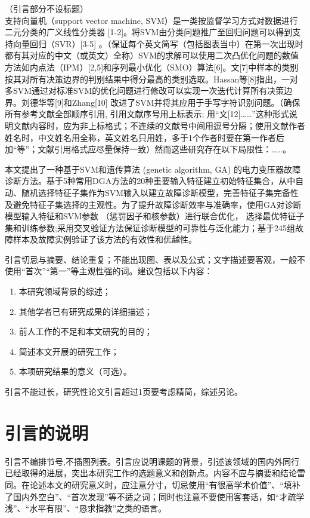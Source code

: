 \documentclass[10.5pt,twocolumn]{jthu-st}
\begin{document}
\enlargethispage{-3.3cm}

（引言部分不设标题）\\
支持向量机（support vector machine, SVM）是一类按监督学习方式对数据进行二元分类的广义线性分类器 [1-2]。将SVM由分类问题推广至回归问题可以得到支持向量回归（SVR）[3-5] 。（保证每个英文简写（包括图表当中）在第一次出现时都有其对应的中文（或英文）全称）SVM的求解可以使用二次凸优化问题的数值方法如内点法（IPM）[2,5]和序列最小优化（SMO）算法[6]。文[7]中样本的类别按其对所有决策边界的判别结果中得分最高的类别选取。Hassan等[8]指出，一对多SVM通过对标准SVM的优化问题进行修改可以实现一次迭代计算所有决策边界。刘德华等[9]和Zhang[10] 改进了SVM并将其应用于手写字符识别问题。（确保所有参考文献全部顺序引用, 引用文献序号用上标表示; 用“文[12]……”这种形式说明文献内容时，应为非上标格式；不连续的文献号中间用逗号分隔；使用文献作者姓名时，中文姓名用全称，英文姓名只用姓，多于1个作者时要在第一作者后加“等”；文献引用格式应尽量保持一致）然而这些研究存在以下局限性：……。
\enlargethispage{-3.3cm}

本文提出了一种基于SVM和遗传算法 (genetic algorithm, GA) 的电力变压器故障诊断方法。基于5种常用DGA方法的20种重要输入特征建立初始特征集合，从中自动、随机选择特征子集作为SVM输入以建立故障诊断模型，完善特征子集完备性及避免特征子集选择的主观性。为了提升故障诊断效率与准确率，使用GA对诊断模型输入特征和SVM参数 （惩罚因子和核参数）进行联合优化， 选择最优特征子集和训练参数;采用交叉验证方法保证诊断模型的可靠性与泛化能力；基于245组故障样本及故障实例验证了该方法的有效性和优越性。

引言切忌与摘要、结论重复；不能出现图、表以及公式；文字描述要客观，一般不使用“首次”“第一”等主观性强的词。建议包括以下内容：
\begin{enumerate}[1)]
    \item 本研究领域背景的综述；
    \item 其他学者已有研究成果的详细描述；
    \item 前人工作的不足和本文研究的目的；
    \item 简述本文开展的研究工作；
    \item 本项研究结果的意义（可选）。
\end{enumerate}
引言不能过长，研究性论文引言超过1页要考虑精简，综述另论。

\section{引言的说明}
引言不编排节号,不插图列表。引言应说明课题的背景，引述该领域的国内外同行已经取得的进展，突出本研究工作的选题意义和创新点。内容不应与摘要和结论雷同。在论述本文的研究意义时，应注意分寸，切忌使用“有很高学术价值”、“填补了国内外空白”、“首次发现”等不适之词；同时也注意不要使用客套话，如“才疏学浅”、“水平有限”、“恳求指教”之类的语言。
\end{document}
